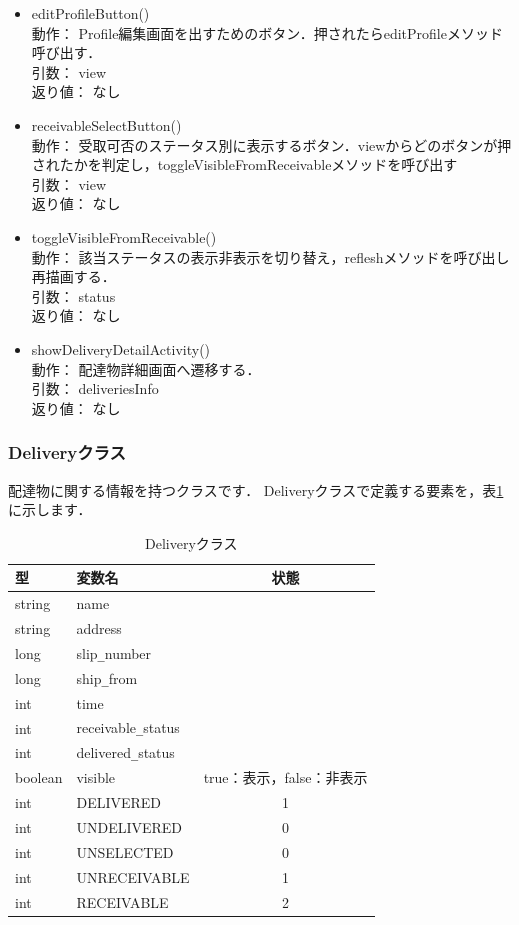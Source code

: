 \documentclass[a4j,titlepage]{jarticle}
\begin{document}
\begin{itemize}
  \item editProfileButton()\\
  動作：  Profile編集画面を出すためのボタン．押されたらeditProfileメソッド呼び出す．\\
  引数：  view\\
  返り値：  なし

  \item receivableSelectButton()\\
  動作：  受取可否のステータス別に表示するボタン．viewからどのボタンが押されたかを判定し，toggleVisibleFromReceivableメソッドを呼び出す\\
  引数：  view\\
  返り値：  なし

  \item toggleVisibleFromReceivable()\\
  動作：  該当ステータスの表示非表示を切り替え，refleshメソッドを呼び出し再描画する．\\
  引数：  status\\
  返り値：  なし

  \item showDeliveryDetailActivity()\\
  動作：  配達物詳細画面へ遷移する．\\
  引数：  deliveriesInfo\\
  返り値：  なし
\end{itemize}

\subsubsection{Deliveryクラス}
配達物に関する情報を持つクラスです．
Deliveryクラスで定義する要素を，表\ref{deliveryTable}に示します．\\
\begin{table}[htb]
\centering
\caption{Deliveryクラス}
\label{deliveryTable}
\begin{tabular}{|llc|}
\hline
型 & 変数名 & 状態      \\ \hline
string  & name  &      \\
string & address &      \\
long  &  slip\verb|_|number  &    \\
long & ship\verb|_|from &      \\
int & time &      \\
int & receivable\verb|_|status &     \\
int & delivered\verb|_|status  &    \\
boolean & visible  &  true：表示，false：非表示    \\
int & DELIVERED  &  1  \\
int & UNDELIVERED  & 0   \\
int & UNSELECTED  &  0  \\
int & UNRECEIVABLE  & 1   \\
int & RECEIVABLE  & 2   \\\hline
\end{tabular}
\end{table}
\end{document}
